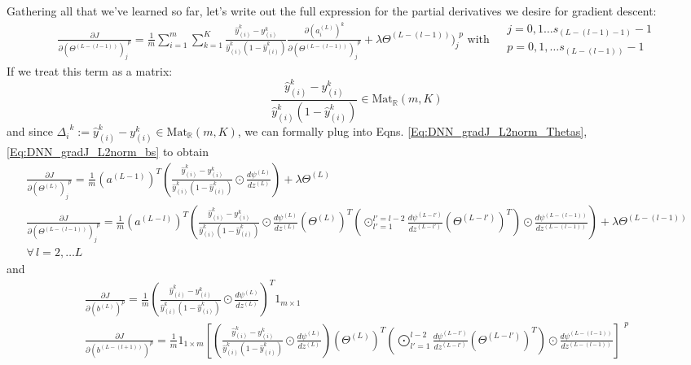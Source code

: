 \documentclass[10pt]{amsart}
\begin{document}
\begin{multicols*}{2}
Gathering all that we've learned so far, let's write out the full expression for the partial derivatives we desire for gradient descent:  
\begin{equation} %
\begin{gathered}
\frac{ \partial J }{ \partial ( \Theta^{(L-(l-1))})_j^{\  \  p} } = \frac{1}{m} \sum_{i=1}^m \sum_{k=1}^K  \frac{\widehat{y}_{(i)}^k - y_{(i)}^k }{ \widehat{y}_{(i)}^k (1 - \widehat{y}_{(i)}^k )}  \frac{ \partial (a_i^{(L)})^k }{ \partial (\Theta^{(L-(l-1))})_j^{\  \  p} } + \lambda  \Theta^{(L-(l-1))})_j^{\  \  p} \text{ with } \begin{aligned} & j = 0,1\dots s_{(L-(l-1)-1)}-1 \\ & p = 0,1,\dots s_{(L-(l-1))} -1 \end{aligned}
\end{gathered}	
\end{equation}
If we treat this term as a matrix:
\[
\frac{\widehat{y}_{(i)}^k - y_{(i)}^k }{ \widehat{y}_{(i)}^k (1 - \widehat{y}_{(i)}^k )} \in \text{Mat}_{\mathbb{R}}(m,K) 
\]
and since $\Delta_i^{\  \   k} := \widehat{y}_{(i)}^k - y_{(i)}^k \in \text{Mat}_{\mathbb{R}}(m,K)$, we can formally plug into Eqns. \ref{Eq:DNN_gradJ_L2norm_Thetas}, \ref{Eq:DNN_gradJ_L2norm_bs} to obtain 
\[
\begin{gathered}
\frac{ \partial J }{ \partial (\Theta^{(L)})_j^{\  \  p} } = \frac{1}{m} (a^{(L-1)})^T \left(  \frac{\widehat{y}_{(i)}^k - y_{(i)}^k }{ \widehat{y}_{(i)}^k (1 - \widehat{y}_{(i)}^k )} \odot \frac{d\psi^{(L)} }{ dz^{(L)} } \right) + \lambda \Theta^{(L)}	\\
\frac{ \partial J }{ \partial (\Theta^{(L-(l-1))})_j^{\  \  p} } = \frac{1}{m} (a^{(L-l)})^T \left(  \frac{\widehat{y}_{(i)}^k - y_{(i)}^k }{ \widehat{y}_{(i)}^k (1 - \widehat{y}_{(i)}^k )} \odot \frac{d\psi^{(L)}}{dz^{(L)} } (\Theta^{(L)})^T \left( \odot_{l'=1}^{l'=l-2} \frac{d\psi^{(L-l')}}{dz^{(L-l') } } (\Theta^{(L-l')})^T \right) \odot \frac{d\psi^{(L-(l-1)) } }{ dz^{(L-(l-1)) } } \right) + \lambda \Theta^{(L-(l-1)) } \\
\forall \, l = 2,\dots L 
\end{gathered}
\]
and 
\[
\begin{gathered}
\frac{\partial J}{ \partial (b^{(L)})^p } = \frac{1}{m} ( \frac{\widehat{y}_{(i)}^k - y_{(i)}^k }{ \widehat{y}_{(i)}^k (1 - \widehat{y}_{(i)}^k )} \odot \frac{d\psi^{(L)}}{dz^{(L)}})^T 1_{m\times 1}   \\
\frac{ \partial J }{ \partial (b^{(L-(l+1) )} )^p } =  \frac{1}{m}  1_{1\times m } \left[ (  \frac{\widehat{y}_{(i)}^k - y_{(i)}^k }{ \widehat{y}_{(i)}^k (1 - \widehat{y}_{(i)}^k )} \odot \frac{d\psi^{(L)} }{ dz^{(L)} } )(\Theta^{(L)})^T \left( \bigodot^{l-2}_{ l'=1} \frac{d \psi^{(L-l')} }{ dz^{(L-l')}} (\Theta^{(L-l')})^T \right) \odot \frac{d\psi^{ (L-(l-1))} }{ dz^{(L-(l-1))}} \right]^{\  \  p } \\

\end{gathered}\]
\end{multicols*}
\end{document}
